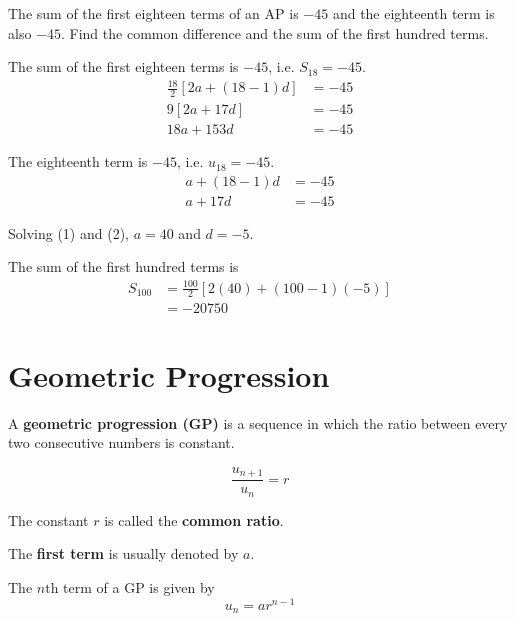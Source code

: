 \documentclass[11pt,a4paper]{book}
\begin{document}
\begin{example}

The sum of the first eighteen terms of an AP is $-45$ and the eighteenth term is also $-45$. Find the common difference and the sum of the first hundred terms.

\Solution

The sum of the first eighteen terms is $-45$, i.e. $S_{18}=-45$.
\begin{align*}
\frac{18}{2}\left[2a+\left(18-1\right)d\right] & =-45\\
9\left[2a+17d\right] & =-45\\
18a+153d & =-45\tag{1}
\end{align*}

The eighteenth term is $-45$, i.e. $u_{18}=-45$.
\begin{align*}
a+\left(18-1\right)d & =-45\\
a+17d & =-45\tag{2}
\end{align*}

Solving (1) and (2), $a=40$ and $d=-5$.

The sum of the first hundred terms is
\begin{align*}
S_{100} & =\frac{100}{2}\left[2\left(40\right)+\left(100-1\right)\left(-5\right)\right]\\
 & =-20750
\end{align*}

\end{example}

\section{Geometric Progression}

\begin{tcolorbox}[colback=blue!5, colframe=black, boxrule=.4pt, sharpish corners]

A \textbf{geometric progression (GP)} is a sequence in which the ratio
between every two consecutive numbers is constant.

\[
\frac{u_{n+1}}{u_{n}}=r
\]

The constant $r$ is called the \textbf{common ratio}.

\medskip{}

The \textbf{first term} is usually denoted by $a$.

\medskip{}

The $n\text{th}$ term of a GP is given by
\[
u_{n}=ar^{n-1}
\]
\end{tcolorbox}
\end{document}
